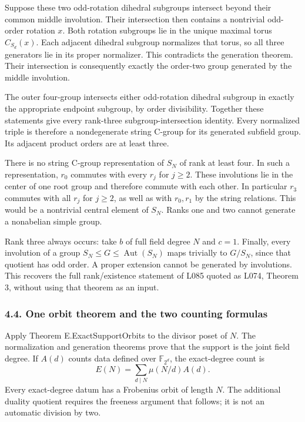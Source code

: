 \documentclass[
  11pt,
  a4paper,
]{article}
\begin{document}
Suppose these two odd-rotation dihedral subgroups intersect beyond their
common middle involution. Their intersection then contains a nontrivial
odd-order rotation \(x\). Both rotation subgroups lie in the unique
maximal torus \(C_{S_d}(x)\). Each adjacent dihedral subgroup normalizes
that torus, so all three generators lie in its proper normalizer. This
contradicts the generation theorem. Their intersection is consequently
exactly the order-two group generated by the middle involution.

The outer four-group intersects either odd-rotation dihedral subgroup in
exactly the appropriate endpoint subgroup, by order divisibility.
Together these statements give every rank-three subgroup-intersection
identity. Every normalized triple is therefore a nondegenerate string
C-group for its generated subfield group. Its adjacent product orders
are at least three.

There is no string C-group representation of \(S_N\) of rank at least
four. In such a representation, \(r_0\) commutes with every \(r_j\) for
\(j\ge2\). These involutions lie in the center of one root group and
therefore commute with each other. In particular \(r_3\) commutes with
all \(r_j\) for \(j\ge2\), as well as with \(r_0,r_1\) by the string
relations. This would be a nontrivial central element of \(S_N\). Ranks
one and two cannot generate a nonabelian simple group.

Rank three always occurs: take \(b\) of full field degree \(N\) and
\(c=1\). Finally, every involution of a group
\(S_N\le G\le\operatorname{Aut}(S_N)\) maps trivially to \(G/S_N\),
since that quotient has odd order. A proper extension cannot be
generated by involutions. This recovers the full rank/existence
statement of L085 quoted as L074, Theorem 3, without using that theorem
as an input.

\subsubsection{4.4. One orbit theorem and the two counting
formulas}\label{one-orbit-theorem-and-the-two-counting-formulas}

Apply Theorem E.ExactSupportOrbits to the divisor poset of \(N\). The
normalization and generation theorems prove that the support is the
joint field degree. If \(A(d)\) counts data defined over
\(\mathbb F_{2^d}\), the exact-degree count is \[
E(N)=\sum_{d\mid N}\mu(N/d)A(d).
\tag{E3}
\] Every exact-degree datum has a Frobenius orbit of length \(N\). The
additional duality quotient requires the freeness argument that follows;
it is not an automatic division by two.
\end{document}
